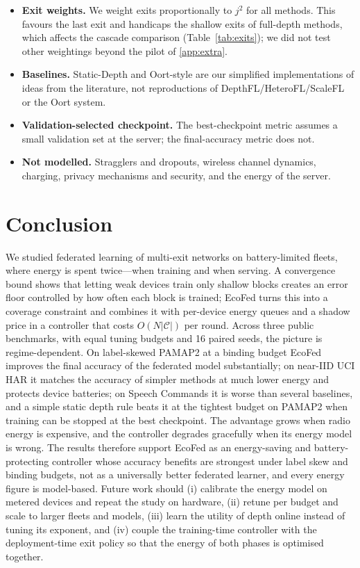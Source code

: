 \begin{itemize}[leftmargin=1.4em,itemsep=1pt]
\item \textbf{Exit weights.} We weight exits proportionally to $j^2$ for all methods. This favours the last exit and handicaps the shallow exits of full-depth methods, which affects the cascade comparison (Table~\ref{tab:exits}); we did not test other weightings beyond the pilot of \ref{app:extra}.
\item \textbf{Baselines.} Static-Depth and Oort-style are our simplified implementations of ideas from the literature, not reproductions of DepthFL/HeteroFL/ScaleFL or the Oort system.
\item \textbf{Validation-selected checkpoint.} The best-checkpoint metric assumes a small validation set at the server; the final-accuracy metric does not.
\item \textbf{Not modelled.} Stragglers and dropouts, wireless channel dynamics, charging, privacy mechanisms and security, and the energy of the server.
\end{itemize}

\section{Conclusion}\label{sec:conclusion}
We studied federated learning of multi-exit networks on battery-limited fleets, where energy is spent twice---when training and when serving. A convergence bound shows that letting weak devices train only shallow blocks creates an error floor controlled by how often each block is trained; EcoFed turns this into a coverage constraint and combines it with per-device energy queues and a shadow price in a controller that costs $O(N|\mathcal C|)$ per round. Across three public benchmarks, with equal tuning budgets and 16 paired seeds, the picture is regime-dependent. On label-skewed PAMAP2 at a binding budget EcoFed improves the final accuracy of the federated model substantially; on near-IID UCI HAR it matches the accuracy of simpler methods at much lower energy and protects device batteries; on Speech Commands it is worse than several baselines, and a simple static depth rule beats it at the tightest budget on PAMAP2 when training can be stopped at the best checkpoint. The advantage grows when radio energy is expensive, and the controller degrades gracefully when its energy model is wrong. The results therefore support EcoFed as an energy-saving and battery-protecting controller whose accuracy benefits are strongest under label skew and binding budgets, not as a universally better federated learner, and every energy figure is model-based. Future work should (i) calibrate the energy model on metered devices and repeat the study on hardware, (ii) retune per budget and scale to larger fleets and models, (iii) learn the utility of depth online instead of tuning its exponent, and (iv) couple the training-time controller with the deployment-time exit policy so that the energy of both phases is optimised together.
